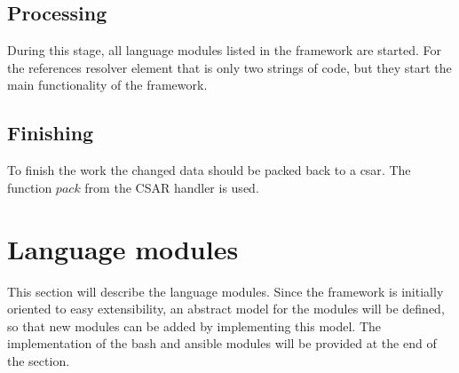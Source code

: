 \subsection*{Processing}
During this stage, all language modules listed in the framework are started.
For the references resolver element that is only two strings of code, but they start the main functionality of the framework.


\subsection*{Finishing}
To finish the work the changed data should be packed back to a \gls{csar}.
The function $pack$ from the CSAR handler is used. 

\section{Language modules} 
This section will describe the language modules. %
Since the framework is initially oriented to easy extensibility, an abstract model for the modules will be defined, so that new modules can be added by implementing this model.
The implementation of the bash and ansible modules will be provided at the end of the section.


